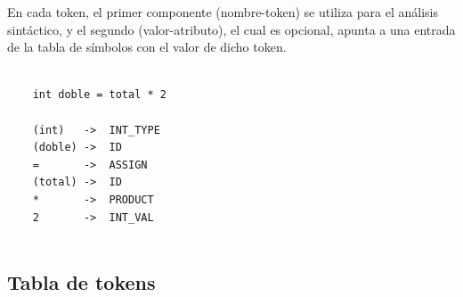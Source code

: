 \documentclass[11pt, english]{article}
\begin{document}
	
	En cada token, el primer componente (nombre-token) se utiliza para el análisis sintáctico, y el segundo (valor-atributo), el cual es opcional, apunta a una entrada de la tabla de símbolos con el valor de dicho token.
	
	\begin{lstlisting}[caption=Ejemplo de conversión de un conjunto de caracteres de un programa WiC en tokens]
	
	int doble = total * 2
	
	(int) 	-> 	INT_TYPE
	(doble) -> 	ID
	= 		-> 	ASSIGN
	(total) -> 	ID
	* 		-> 	PRODUCT
	2		->	INT_VAL
	
	\end{lstlisting}
	
	\subsection{Tabla de tokens}\label{Tabla de tokens}
	
\end{document}
